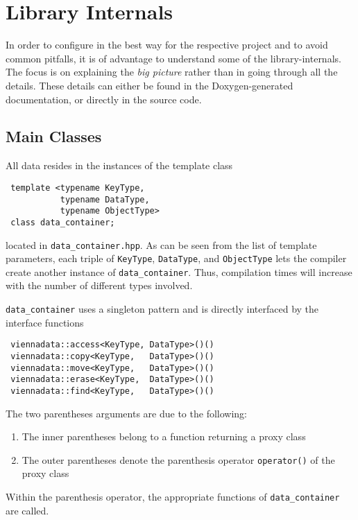 \chapter{Library Internals} \label{chap:internals}
In order to configure {\ViennaData} in the best way for the respective project and to avoid common pitfalls,
it is of advantage to understand some of the library-internals.
The focus is on explaining the \emph{big picture} rather than in going through all the details.
These details can either be found in the Doxygen-generated documentation, or directly in the source code.

\section{Main Classes}
All data resides in the instances of the template class
\begin{lstlisting}
 template <typename KeyType,
           typename DataType,
           typename ObjectType>
 class data_container;
\end{lstlisting}
located in \lstinline|data_container.hpp|.
As can be seen from the list of template parameters, each triple of \lstinline|KeyType|, \lstinline|DataType|, and \lstinline|ObjectType| lets
the compiler create another instance of \lstinline|data_container|. Thus, compilation times will increase with the number of different types involved.

\lstinline|data_container| uses a singleton pattern and is directly interfaced by the interface functions
\begin{lstlisting}
 viennadata::access<KeyType, DataType>()()
 viennadata::copy<KeyType,   DataType>()()
 viennadata::move<KeyType,   DataType>()()
 viennadata::erase<KeyType,  DataType>()()
 viennadata::find<KeyType,   DataType>()()
\end{lstlisting}
The two parentheses arguments are due to the following:
\begin{enumerate}
 \item The inner parentheses belong to a function returning a proxy class
 \item The outer parentheses denote the parenthesis operator \lstinline|operator()| of the proxy class
\end{enumerate}
Within the parenthesis operator, the appropriate functions of \lstinline|data_container| are called.

